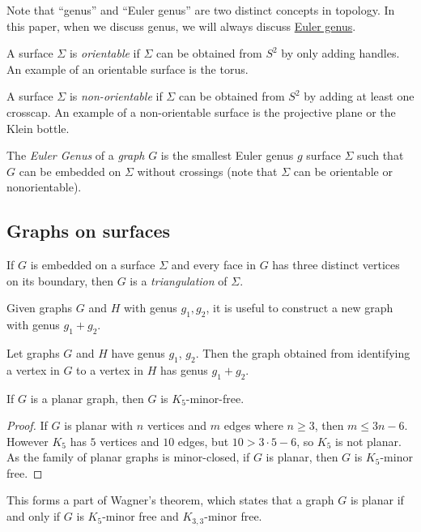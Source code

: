 Note that ``genus'' and ``Euler genus'' are two distinct concepts in topology. In this paper, when we discuss genus, we will always discuss \underline{Euler genus}.

A surface \(\Sigma\) is \textit{orientable} if \(\Sigma\) can be obtained from \(S^2\) by only adding handles. An example of an orientable surface is the torus.

A surface \(\Sigma\) is \textit{non-orientable} if \(\Sigma\) can be obtained from \(S^2\) by adding at least one crosscap. An example of a non-orientable surface is the projective plane or the Klein bottle. 

The \textit{Euler Genus} of a \textit{graph} \(G\) is the smallest Euler genus \(g\) surface \(\Sigma\) such that \(G\) can be embedded on \(\Sigma\) without crossings (note that \(\Sigma\) can be orientable or nonorientable). 


\subsection{Graphs on surfaces}

If $G$ is embedded on a surface $\Sigma$ and every face in $G$ has three distinct vertices on its boundary, then $G$ is a \textit{triangulation} of $\Sigma$. 

Given graphs $G$ and $H$ with genus $g_1, g_2$, it is useful to construct a new graph with genus $g_1 + g_2$. 
\begin{theorem}\label{thm:additivity_genus}
	Let graphs $G$ and $H$ have genus $g_1$, $g_2$. Then the graph obtained from identifying a vertex in $G$ to a vertex in $H$ has genus $g_1 + g_2$. 
\end{theorem}

\begin{lemma}\label{thm:K5_Free_Planar}
	If \(G\) is a planar graph, then \(G\) is \(K_5\)-minor-free.
\end{lemma}
\begin{proof}
	If \(G\) is planar with \(n\) vertices and \(m\) edges where $n \geq 3$, then \(m \leq 3n -6\).
	However \(K_5\) has \(5\) vertices and \(10\) edges, but  \( 10 > 3 \cdot 5 - 6\), so \(K_5\) is not planar. As the family of planar graphs is minor-closed, if \(G\) is planar, then $G$ is \(K_5\)-minor free.
\end{proof}

This forms a part of Wagner's theorem, which states that a graph $G$ is planar if and only if $G$ is $K_5$-minor free and $K_{3,3}$-minor free. 

